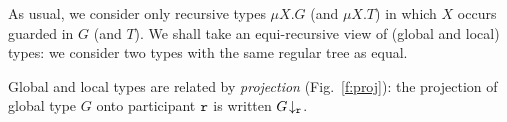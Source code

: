 \documentclass[runningheads]{llncs}
\begin{document}
As usual, we consider only recursive types $\mu X. G$ (and $\mu X. T$) in which $X$ occurs guarded in $G$ (and $T$).
 We shall take an equi-recursive view of (global and local) types: we consider two  types with the same regular tree as equal.
 
Global and local types are related by  \emph{projection} (Fig.~\ref{f:proj}):
the projection of global type $G$ onto participant $\mathtt{r}$ is written $G\!\downarrow_{\mathtt{r}}$. 
\end{document}
